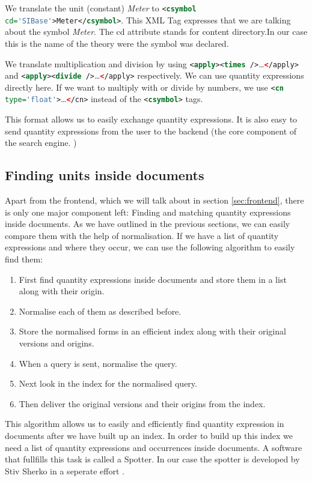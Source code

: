 We translate the unit (constant) \textit{Meter} to \lstinline[language=XML]{<csymbol cd='SIBase'>Meter</csymbol>}. This XML Tag expresses that we are talking about the symbol \textit{Meter}. The cd attribute stands for content directory.In our case this is the name of the theory were the symbol was declared.

We translate multiplication and division by using \lstinline[language=XML]{<apply><times />}\dots\lstinline[language=XML]{</apply>} and \lstinline[language=XML]{<apply><divide />}\dots\lstinline[language=XML]{</apply>} respectively. We can use quantity expressions directly here. If we want to multiply with or divide by numbers, we use \lstinline[language=XML]{<cn type='float'>}\dots\lstinline[language=XML]{</cn>} instead of the \lstinline[language=XML]{<csymbol>} tags.

This format allows us to easily exchange quantity expressions. It is also easy to send quantity expressions from the user to the backend (the core component of the search engine. )

\subsection{Finding units inside documents}
Apart from the frontend, which we will talk about in section \ref{sec:frontend}, there is only one major component left: Finding and matching quantity expressions inside documents. As we have outlined in the previous sections, we can easily compare them with the help of normalisation. If we have a list of quantity expressions and where they occur, we can use the following algorithm to easily find them:
\begin{enumerate}
  \item First find quantity expressions inside documents and store them in a list along with their origin.
  \item Normalise each of them as described before.
  \item Store the normalised forms in an efficient index along with their original versions and origins.
  \item When a query is sent, normalise the query.
  \item Next look in the index for the normalised query.
  \item Then deliver the original versions and their origins from the index.
\end{enumerate}
This algorithm allows us to easily and efficiently find quantity expression in documents after we have built up an index. In order to build up this index we need a list of quantity expressions and occurrences inside documents. A software that fullfills this task is called a Spotter. In our case the spotter is developed by Stiv Sherko in a seperate effort \cite{proposal:sharko}. 

